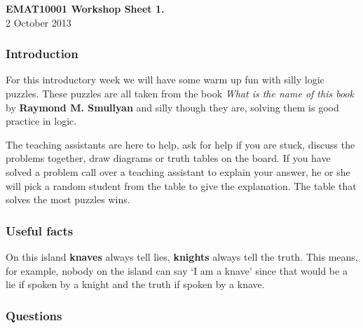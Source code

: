 \documentclass[12pt]{article}
\begin{document}
\begin{center}
{\bf EMAT10001 Workshop Sheet 1.}\\[1cm]{} 2 October 2013
\end{center}
\subsubsection*{Introduction} 
For this introductory week we will have some warm up fun with silly
logic puzzles. These puzzles are all taken from the book {\sl What is
  the name of this book} by {\bf Raymond M. Smullyan} and silly though
they are, solving them is good practice in logic.  

The teaching assistants are here to help, ask for help if you are
stuck, discuss the problems together, draw diagrams or truth tables on
the board. If you have solved a problem call over a teaching assistant
to explain your answer, he or she will pick a random student from the
table to give the explanation. The table that solves the most puzzles
wins.
\subsubsection*{Useful facts}
On this island {\bf knaves} always tell lies, {\bf knights} always
tell the truth. This means, for example, nobody on the island can say
\lq{}I am a knave\rq{} since that would be a lie if spoken by a knight and the
truth if spoken by a knave.

\subsubsection*{Questions}
\end{document}
